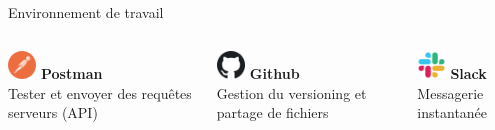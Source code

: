 \documentclass{beamer}
\begin{document}
\begin{frame}[label=environnement]{Environnement de travail}
\begin{center}
\begin{minipage}{0.9\textwidth}
\begin{columns}[T, onlytextwidth]
        			
        				\begin{minipage}[t][2cm][t]{\linewidth}
        					\raggedright
          				\includegraphics[width=0.75cm, height=0.75cm]{../img/logo_postman.png}
          				\hspace{0.6cm} \textbf{Postman} \\
          				Tester et envoyer des requêtes serveurs (API)
          			\end{minipage}
          			\vspace{0.7em}
          			\pause
          			
          			\begin{minipage}[t][2cm][t]{\linewidth}
          				\raggedright
          				\includegraphics[width=0.75cm, height=0.75cm]{../img/logo_github.png}
          				\hspace{0.6cm} \textbf{Github} \\
          				Gestion du versioning et partage de fichiers
          			\end{minipage}
          			\vspace{0.7em}
          			\pause
          			
          			\begin{minipage}[t][2cm][t]{\linewidth}
          				\raggedright
          				\includegraphics[width=0.75cm, height=0.75cm]{../img/logo_slack.png}
          				\hspace{0.6cm} \textbf{Slack} \\
          				Messagerie instantanée
          			\end{minipage}

      		\end{columns}
  		\end{minipage}
	\end{center}
	\vfill
\end{frame}
\end{document}
